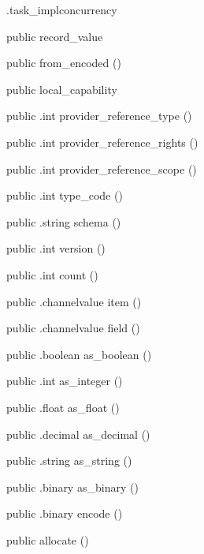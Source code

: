 \begin{CrexxClass}{.task\_impl}{concurrency}
\begin{Members}
    \Factory
      {public}
      {record\_value}
      {}

    \Factory
      {public}
      {from\_encoded}
      {()}

    \Factory
      {public}
      {local\_capability}
      {}

    \Method
      {public}
      {.int}
      {provider\_reference\_type}
      {()}

    \Method
      {public}
      {.int}
      {provider\_reference\_rights}
      {()}

    \Method
      {public}
      {.int}
      {provider\_reference\_scope}
      {()}

    \Method
      {public}
      {.int}
      {type\_code}
      {()}

    \Method
      {public}
      {.string}
      {schema}
      {()}

    \Method
      {public}
      {.int}
      {version}
      {()}

    \Method
      {public}
      {.int}
      {count}
      {()}

    \Method
      {public}
      {.channelvalue}
      {item}
      {()}

    \Method
      {public}
      {.channelvalue}
      {field}
      {()}

    \Method
      {public}
      {.boolean}
      {as\_boolean}
      {()}

    \Method
      {public}
      {.int}
      {as\_integer}
      {()}

    \Method
      {public}
      {.float}
      {as\_float}
      {()}

    \Method
      {public}
      {.decimal}
      {as\_decimal}
      {()}

    \Method
      {public}
      {.string}
      {as\_string}
      {()}

    \Method
      {public}
      {.binary}
      {as\_binary}
      {()}

    \Method
      {public}
      {.binary}
      {encode}
      {()}

    \Factory
      {public}
      {allocate}
      {()}


\end{Members}
\end{CrexxClass}
